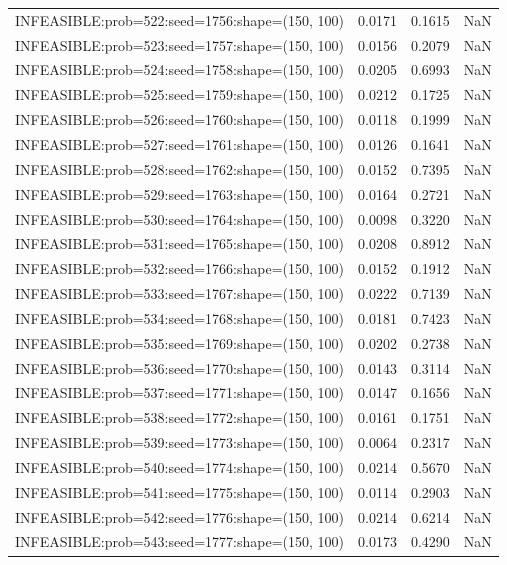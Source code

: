 \begin{longtable}{lccc}
INFEASIBLE:prob=522:seed=1756:shape=(150, 100) &   0.0171 &  0.1615 &    NaN \\
INFEASIBLE:prob=523:seed=1757:shape=(150, 100) &   0.0156 &  0.2079 &    NaN \\
INFEASIBLE:prob=524:seed=1758:shape=(150, 100) &   0.0205 &  0.6993 &    NaN \\
INFEASIBLE:prob=525:seed=1759:shape=(150, 100) &   0.0212 &  0.1725 &    NaN \\
INFEASIBLE:prob=526:seed=1760:shape=(150, 100) &   0.0118 &  0.1999 &    NaN \\
INFEASIBLE:prob=527:seed=1761:shape=(150, 100) &   0.0126 &  0.1641 &    NaN \\
INFEASIBLE:prob=528:seed=1762:shape=(150, 100) &   0.0152 &  0.7395 &    NaN \\
INFEASIBLE:prob=529:seed=1763:shape=(150, 100) &   0.0164 &  0.2721 &    NaN \\
INFEASIBLE:prob=530:seed=1764:shape=(150, 100) &   0.0098 &  0.3220 &    NaN \\
INFEASIBLE:prob=531:seed=1765:shape=(150, 100) &   0.0208 &  0.8912 &    NaN \\
INFEASIBLE:prob=532:seed=1766:shape=(150, 100) &   0.0152 &  0.1912 &    NaN \\
INFEASIBLE:prob=533:seed=1767:shape=(150, 100) &   0.0222 &  0.7139 &    NaN \\
INFEASIBLE:prob=534:seed=1768:shape=(150, 100) &   0.0181 &  0.7423 &    NaN \\
INFEASIBLE:prob=535:seed=1769:shape=(150, 100) &   0.0202 &  0.2738 &    NaN \\
INFEASIBLE:prob=536:seed=1770:shape=(150, 100) &   0.0143 &  0.3114 &    NaN \\
INFEASIBLE:prob=537:seed=1771:shape=(150, 100) &   0.0147 &  0.1656 &    NaN \\
INFEASIBLE:prob=538:seed=1772:shape=(150, 100) &   0.0161 &  0.1751 &    NaN \\
INFEASIBLE:prob=539:seed=1773:shape=(150, 100) &   0.0064 &  0.2317 &    NaN \\
INFEASIBLE:prob=540:seed=1774:shape=(150, 100) &   0.0214 &  0.5670 &    NaN \\
INFEASIBLE:prob=541:seed=1775:shape=(150, 100) &   0.0114 &  0.2903 &    NaN \\
INFEASIBLE:prob=542:seed=1776:shape=(150, 100) &   0.0214 &  0.6214 &    NaN \\
INFEASIBLE:prob=543:seed=1777:shape=(150, 100) &   0.0173 &  0.4290 &    NaN \\

\end{longtable}
